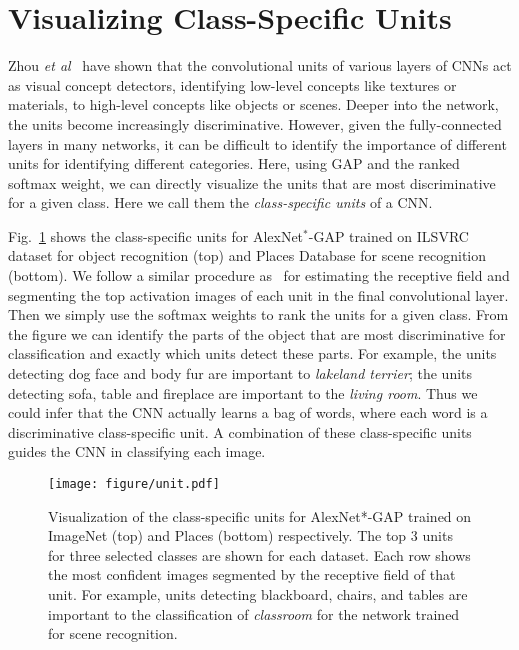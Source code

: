 \documentclass[10pt,twocolumn,letterpaper]{article}
\begin{document}
\section{Visualizing Class-Specific Units}

Zhou \textit{et al}~\cite{zhou2014object} have shown that the convolutional units of various layers of CNNs act as visual concept detectors, identifying  low-level concepts like textures or materials, to high-level concepts like objects or scenes. Deeper into the network, the units become increasingly discriminative. However, given the fully-connected layers in many networks, it can be difficult to identify the importance of different units for identifying different categories. Here, using GAP and the ranked softmax weight, we can directly visualize the units that are most discriminative for a given class. Here we call them the \textit{class-specific units} of a CNN. 

Fig.~\ref{fig:unitvisualization} shows the class-specific units for AlexNet$^{*}$-GAP trained on ILSVRC dataset for object recognition (top) and Places Database for scene recognition (bottom).
We follow a similar procedure as~\cite{zhou2014object} for estimating the receptive field and segmenting the top activation images of each unit in the final convolutional layer. Then we simply use the softmax weights to rank the units for a given class. From the figure we can identify the parts of the object that are most discriminative for classification and exactly which units detect these parts. For example, the units detecting dog face and body fur are important to  \textit{lakeland terrier}; the units detecting sofa, table and fireplace are important to the  \textit{living room}. Thus we could infer that the CNN actually learns a bag of words, where each word is a discriminative class-specific unit. A combination of these class-specific units guides the CNN in classifying each image.


\begin{figure}
\begin{center}
 \texttt{[image: figure/unit.pdf]}
\end{center}
\vspace*{-4mm}
\caption{Visualization of the class-specific units for AlexNet*-GAP trained on ImageNet (top) and Places (bottom) respectively. The top 3 units for three selected classes are shown for each dataset. Each row shows the most confident images segmented by the receptive field of that unit. For example, units detecting blackboard, chairs, and tables are important to the classification of  \textit{classroom} for the network trained for scene recognition.}
\label{fig:unitvisualization}
\end{figure}
\end{document}
